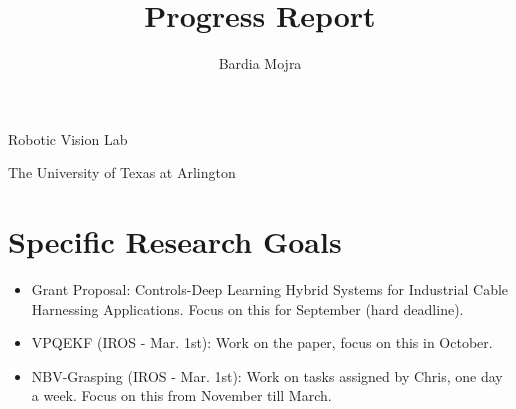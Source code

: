 \documentclass[11pt]{article}
\title{Progress Report}
\author{Bardia Mojra}
\begin{document}
\maketitle
\thispagestyle{empty}

\bigskip
\bigskip
\begin{center}
      Robotic Vision Lab
\end{center}

\begin{center}
      The University of Texas at Arlington
\end{center}

\newpage

\section{Specific Research Goals}
\begin{itemize}
      \item Grant Proposal: Controls-Deep Learning Hybrid Systems for Industrial Cable Harnessing Applications. Focus on this for September (hard deadline).
      \item VPQEKF (IROS - Mar. 1st): Work on the paper, focus on this in October.
      \item NBV-Grasping (IROS - Mar. 1st): Work on tasks assigned by Chris, one day a week. Focus on this from November till March.
\end{itemize}
\end{document}
